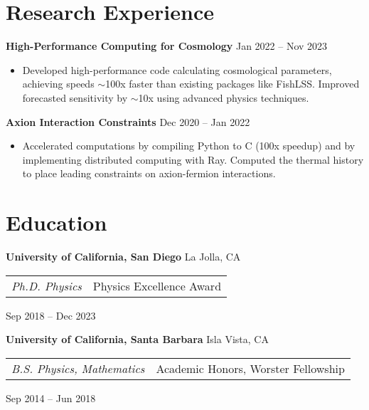\documentclass[letterpaper,12pt]{article}
\newenvironment{zitemize}{
\begin{itemize} \vspace{-.8em}\itemsep 0pt \parskip 0pt}
{\end{itemize}\vspace{-.7em}}
\begin{document}
\section{Research Experience}

\textbf{High-Performance Computing for Cosmology} \hfill Jan 2022 -- Nov 2023 \\
\begin{zitemize}
    \item Developed high-performance code calculating cosmological parameters, achieving speeds $\sim$100x faster than existing packages like FishLSS. Improved forecasted sensitivity by $\sim$10x using advanced physics techniques.
\end{zitemize}

\textbf{Axion Interaction Constraints} \hfill Dec 2020 -- Jan 2022 \\
\begin{zitemize}
    \item Accelerated computations by compiling Python to C (100x speedup) and by implementing distributed computing with Ray. Computed the thermal history to place leading constraints on axion-fermion interactions.
\end{zitemize}



\section{Education}

\textbf{University of California, San Diego} \hfill La Jolla, CA \\
\begin{tabular}{p{12em} p{20em}}
    \textit{Ph.D. Physics} 
    & Physics Excellence Award 
\end{tabular}
\hfill Sep 2018 -- Dec 2023

\textbf{University of California, Santa Barbara} \hfill Isla Vista, CA \\
\begin{tabular}{p{12em} p{20em}}
    \textit{B.S. Physics, Mathematics}
    & Academic Honors, Worster Fellowship
\end{tabular}
\hfill Sep 2014 -- Jun 2018
\end{document}
